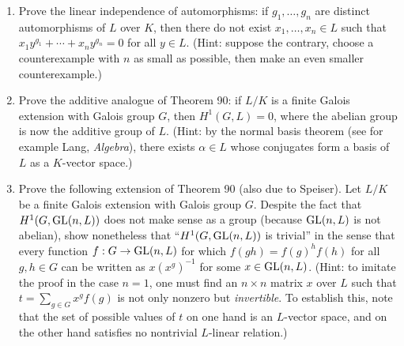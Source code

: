 \begin{enumerate}
\item
Prove the linear independence of automorphisms: if $g_1, \dots, g_n$
are distinct automorphisms of $L$ over $K$, then there do not exist
$x_1, \dots, x_n \in L$ such that $x_1 y^{g_1} + \cdots + x_n y^{g_n} = 0$
for all $y \in L$. (Hint: suppose the contrary, choose a counterexample
with $n$ as small as possible, then make an even smaller counterexample.)
\item
Prove the additive analogue of Theorem 90: if $L/K$ is a finite
Galois extension with Galois group $G$, then $H^1(G, L) = 0$, where the
abelian group is now the additive group of $L$.
(Hint: by the normal basis theorem
(see for example Lang, \emph{Algebra}),
there exists $\alpha \in L$ whose conjugates form a basis
of $L$ as a $K$-vector space.)
\item
Prove the following extension of Theorem 90 (also due to Speiser).
Let $L/K$ be a finite Galois extension with Galois group $G$.
Despite the fact that $H^1(G, \operatorname{GL}(n,L))$ does not make sense as a group (because $\operatorname{GL}(n,L)$ is not abelian), show nonetheless that ``$H^1(G, \operatorname{GL}(n,L))$ is trivial'' in the sense that every function $f: G \to \operatorname{GL}(n,L)$ for which $f(gh) = f(g)^h f(h)$ for all $g,h \in G$ can be written as $x (x^g)^{-1}$ for some $x \in \operatorname{GL}(n,L)$. (Hint: to imitate the proof in the case $n=1$,
one must find an $n \times n$ matrix $x$ over $L$ such that $t = \sum_{g \in G} x^g f(g)$
is not only nonzero but \emph{invertible}. To establish this, note that the set of possible values of $t$ on one hand is an $L$-vector space, and on the other hand satisfies no nontrivial $L$-linear relation.)
\end{enumerate}

%



